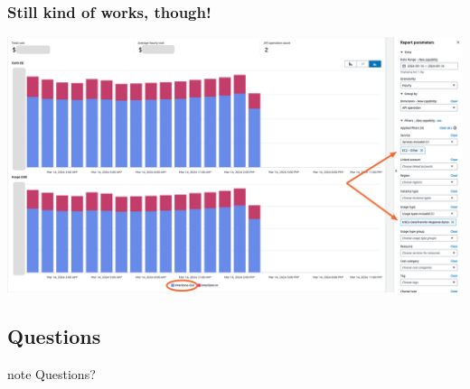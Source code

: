 \documentclass{beamer}
\begin{document}
\begin{frame}
  \frametitle{Still kind of works, though!}

  \begin{center}
    \includegraphics[keepaspectratio,width=\textwidth,height=0.8\textheight]{producer.png}
  \end{center}
\end{frame}

\subsection*{Questions}

\begin{frame}
\begin{beamercolorbox}[center]{note}
  \Huge Questions?
\end{beamercolorbox}
\end{frame}
\end{document}
